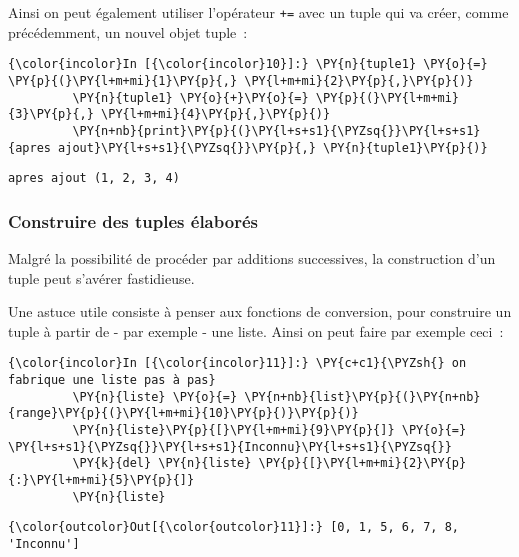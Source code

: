     Ainsi on peut également utiliser l'opérateur \texttt{+=} avec un tuple
qui va créer, comme précédemment, un nouvel objet tuple~:

    \begin{Verbatim}[commandchars=\\\{\}]
{\color{incolor}In [{\color{incolor}10}]:} \PY{n}{tuple1} \PY{o}{=} \PY{p}{(}\PY{l+m+mi}{1}\PY{p}{,} \PY{l+m+mi}{2}\PY{p}{,}\PY{p}{)}
         \PY{n}{tuple1} \PY{o}{+}\PY{o}{=} \PY{p}{(}\PY{l+m+mi}{3}\PY{p}{,} \PY{l+m+mi}{4}\PY{p}{,}\PY{p}{)}
         \PY{n+nb}{print}\PY{p}{(}\PY{l+s+s1}{\PYZsq{}}\PY{l+s+s1}{apres ajout}\PY{l+s+s1}{\PYZsq{}}\PY{p}{,} \PY{n}{tuple1}\PY{p}{)}
\end{Verbatim}


    \begin{Verbatim}[commandchars=\\\{\}]
apres ajout (1, 2, 3, 4)

    \end{Verbatim}

    \hypertarget{construire-des-tuples-uxe9laboruxe9s}{%
\subsubsection{Construire des tuples
élaborés}\label{construire-des-tuples-uxe9laboruxe9s}}

    Malgré la possibilité de procéder par additions successives, la
construction d'un tuple peut s'avérer fastidieuse.

    Une astuce utile consiste à penser aux fonctions de conversion, pour
construire un tuple à partir de - par exemple - une liste. Ainsi on peut
faire par exemple ceci~:

    \begin{Verbatim}[commandchars=\\\{\}]
{\color{incolor}In [{\color{incolor}11}]:} \PY{c+c1}{\PYZsh{} on fabrique une liste pas à pas}
         \PY{n}{liste} \PY{o}{=} \PY{n+nb}{list}\PY{p}{(}\PY{n+nb}{range}\PY{p}{(}\PY{l+m+mi}{10}\PY{p}{)}\PY{p}{)}
         \PY{n}{liste}\PY{p}{[}\PY{l+m+mi}{9}\PY{p}{]} \PY{o}{=} \PY{l+s+s1}{\PYZsq{}}\PY{l+s+s1}{Inconnu}\PY{l+s+s1}{\PYZsq{}}
         \PY{k}{del} \PY{n}{liste} \PY{p}{[}\PY{l+m+mi}{2}\PY{p}{:}\PY{l+m+mi}{5}\PY{p}{]}
         \PY{n}{liste}
\end{Verbatim}


\begin{Verbatim}[commandchars=\\\{\}]
{\color{outcolor}Out[{\color{outcolor}11}]:} [0, 1, 5, 6, 7, 8, 'Inconnu']
\end{Verbatim}
            
